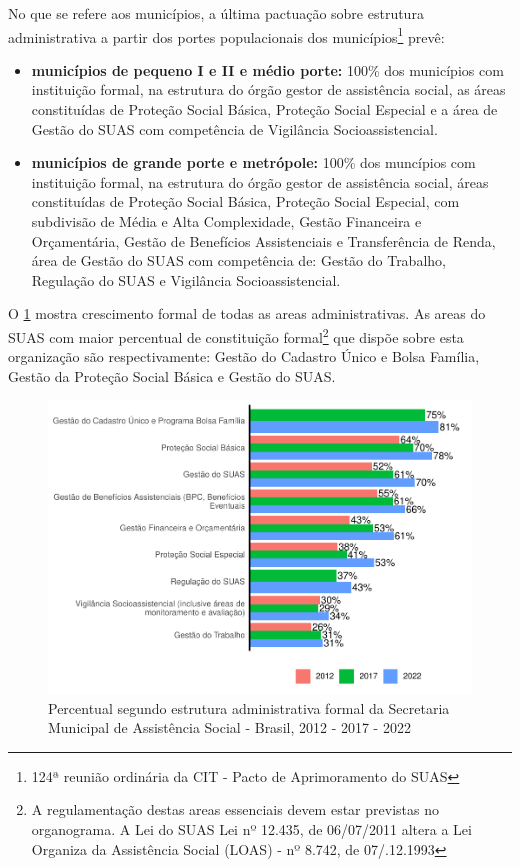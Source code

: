 \documentclass[
  brazilian]{report}
\begin{document}
No que se refere aos municípios, a última pactuação sobre estrutura
administrativa a partir dos portes populacionais dos
municípios\footnote{124ª reunião ordinária da CIT - Pacto de Aprimoramento do SUAS}
prevê:

\begin{itemize}
\item
  \textbf{municípios de pequeno I e II e médio porte:} 100\% dos
  municípios com instituição formal, na estrutura do órgão gestor de
  assistência social, as áreas constituídas de Proteção Social Básica,
  Proteção Social Especial e a área de Gestão do SUAS com competência de
  Vigilância Socioassistencial.
\item
  \textbf{municípios de grande porte e metrópole:} 100\% dos muncípios
  com instituição formal, na estrutura do órgão gestor de assistência
  social, áreas constituídas de Proteção Social Básica, Proteção Social
  Especial, com subdivisão de Média e Alta Complexidade, Gestão
  Financeira e Orçamentária, Gestão de Benefícios Assistenciais e
  Transferência de Renda, área de Gestão do SUAS com competência de:
  Gestão do Trabalho, Regulação do SUAS e Vigilância Socioassistencial.
\end{itemize}

O \cref{fig:munic_sub} mostra crescimento formal de todas as areas
administrativas. As areas do SUAS com maior percentual de constituição
formal\footnote{A regulamentação destas areas essenciais devem estar previstas no organograma. A Lei do SUAS Lei nº 12.435, de 06/07/2011 altera a Lei Organiza da Assistência Social (LOAS) - nº 8.742, de 07/.12.1993}
que dispõe sobre esta organização são respectivamente: Gestão do
Cadastro Único e Bolsa Família, Gestão da Proteção Social Básica e
Gestão do SUAS.

\begin{figure}
\includegraphics{Censo-SUAS-2022_files/figure-latex/munic_sub-1} \caption[Percentual segundo estrutura administrativa formal da Secretaria Municipal de Assistência Social - Brasil, 2012 - 2017 - 2022]{Percentual segundo estrutura administrativa formal da Secretaria Municipal de Assistência Social - Brasil, 2012 - 2017 - 2022}\label{fig:munic_sub}
\end{figure}
\end{document}
